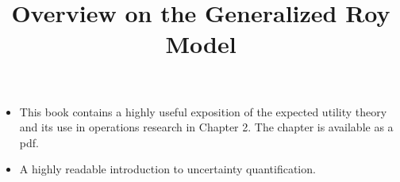 

\title{Overview on the Generalized Roy Model}
\author{}
\date{}



\maketitle
\begin{itemize}
\item {}
This book contains a highly useful exposition of the expected utility theory and its use in operations research in Chapter 2. The chapter is available as a pdf.

\item {}
A highly readable introduction to uncertainty quantification.
\end{itemize}





